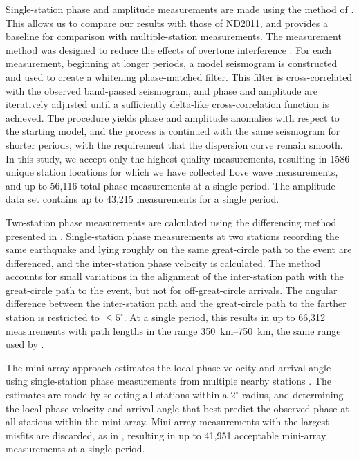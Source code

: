 \documentclass[12pt,oneside]{book}
\newcommand{\degree}[1]{\mbox{$#1^{\circ}$}}
\begin{document}
Single-station phase and amplitude measurements are made using the method of \citet{Ekstrom1997}. This allows us to compare our results with those of ND2011, and provides a baseline for comparison with multiple-station measurements. The measurement method was designed to reduce the effects of overtone interference \citep{Ekstrom1997, Nettles2011}. For each measurement, beginning at longer periods, a model seismogram is constructed and used to create a whitening phase-matched filter. This filter is cross-correlated with the observed band-passed seismogram, and phase and amplitude are iteratively adjusted until a sufficiently delta-like cross-correlation function is achieved. The procedure yields phase and amplitude anomalies with respect to the starting model, and the process is continued with the same seismogram for shorter periods, with the requirement that the dispersion curve remain smooth. In this study, we accept only the highest-quality measurements, resulting in 1586 unique station locations for which we have collected Love wave measurements, and up to 56,116 total phase measurements at a single period. The amplitude data set contains up to 43,215 measurements for a single period. 

Two-station phase measurements are calculated using the differencing method presented in \citet{Fosteretal2014}. Single-station phase measurements at two stations recording the same earthquake and lying roughly on the same great-circle path to the event are differenced, and the inter-station phase velocity is calculated. The method accounts for small variations in the alignment of the inter-station path with the great-circle path to the event, but not for off-great-circle arrivals. The angular difference between the inter-station path and the great-circle path to the farther station is restricted to $\leq \degree{5}$. At a single period, this results in up to 66,312 measurements with path lengths in the range 350~km--750~km, the same range used by \citet{Fosteretal2014}. 

The mini-array approach estimates the local phase velocity and arrival angle using single-station phase measurements from multiple nearby stations \citep{Fosteretal2014,Fosteretal2014aa}. The estimates are made by selecting all stations within a \degree{2} radius, and determining the local phase velocity and arrival angle that best predict the observed phase at all stations within the mini array. Mini-array measurements with the largest misfits are discarded, as in \citet{Fosteretal2014}, resulting in up to 41,951 acceptable mini-array measurements at a single period. 
\end{document}
